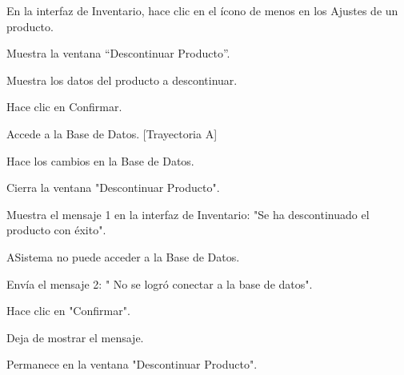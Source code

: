 \begin{UCtrayectoria}
	
	\UCpaso[\UCactor] En la interfaz de Inventario, hace clic en el ícono de menos en los Ajustes de un producto.

	\UCpaso[\UCsist] Muestra la ventana “Descontinuar Producto”.

	\UCpaso[\UCsist] Muestra los datos del producto a descontinuar.

	\UCpaso[\UCactor] Hace clic en Confirmar.

	\UCpaso[\UCsist] Accede a la Base de Datos. [Trayectoria A]

	\UCpaso[\UCsist] Hace los cambios en la Base de Datos.

	\UCpaso[\UCsist] Cierra la ventana "Descontinuar Producto".

	\UCpaso[\UCsist] Muestra el mensaje 1 en la interfaz de Inventario: "Se ha descontinuado el producto con éxito".
	
\end{UCtrayectoria}

\begin{UCtrayectoriaA}{A}{Sistema no puede acceder a la Base de Datos.}
	
	\UCpaso[\UCsist] Envía el mensaje 2: " No se logró conectar a la base de datos".
	
	\UCpaso[\UCactor] Hace clic en "Confirmar".

	\UCpaso[\UCsist] Deja de mostrar el mensaje.

	\UCpaso[] Permanece en la ventana "Descontinuar Producto".

\end{UCtrayectoriaA}